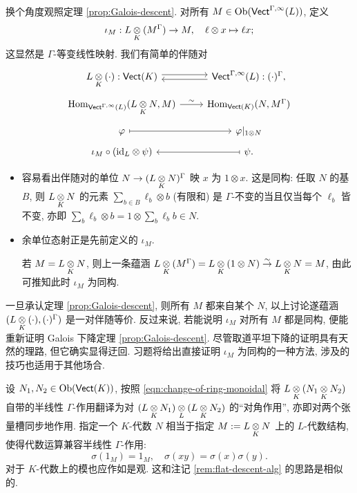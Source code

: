 换个角度观照定理 \ref{prop:Galois-descent}. 对所有 $M \in \operatorname{Ob}(\mathsf{Vect}^{\Gamma, \infty}(L))$, 定义
\begin{equation}\label{eqn:Galois-descent-iotaM}
	\iota_M: L \underset{K}{\otimes} (M^{\Gamma}) \to M, \quad
	\ell \otimes x \mapsto \ell x ;
\end{equation}
这显然是 $\Gamma$-等变线性映射. 我们有简单的伴随对
\begin{equation}\label{eqn:Galois-descent-adjunction}
	\begin{tikzcd}[row sep=tiny]
		L \dotimes{K} (\cdot) : \cate{Vect}(K) \arrow[shift left, r] & \cate{Vect}^{\Gamma, \infty}(L) : (\cdot)^{\Gamma}, \arrow[shift left, l] \\
		\Hom_{\cate{Vect}^{\Gamma, \infty}(L)} (L \dotimes{K} N, M) \arrow[r, "\sim"] & \Hom_{\cate{Vect}(K)}(N, M^{\Gamma}) \\
		\varphi \arrow[mapsto, r] & \varphi|_{1 \otimes N} \\
		\iota_M \circ (\identity_L \otimes \psi) & \psi. \arrow[mapsto, l]
	\end{tikzcd}
\end{equation}
\begin{itemize}
	\item 容易看出伴随对的单位 $N \to (L \underset{K}{\otimes} N)^{\Gamma}$ 映 $x$ 为 $1 \otimes x$. 这是同构: 任取 $N$ 的基 $B$, 则 $L \underset{K}{\otimes} N$ 的元素 $\sum_{b \in B} \ell_b \otimes b$ (有限和) 是 $\Gamma$-不变的当且仅当每个 $\ell_b$ 皆不变, 亦即 $\sum_b \ell_b \otimes b = 1 \otimes \sum_b \ell_b b \in N$.
	\item 余单位态射正是先前定义的 $\iota_M$.
	
	若 $M = L \underset{K}{\otimes} N$, 则上一条蕴涵 $L \underset{K}{\otimes} (M^{\Gamma}) = L \underset{K}{\otimes} (1 \otimes N) \stackrel{\sim}{\rightarrow} L \underset{K}{\otimes} N = M$, 由此可推知此时 $\iota_M$ 为同构. 
\end{itemize}

一旦承认定理 \ref{prop:Galois-descent}, 则所有 $M$ 都来自某个 $N$, 以上讨论遂蕴涵 $(L \underset{K}{\otimes} (\cdot), (\cdot)^{\Gamma})$ 是一对伴随等价. 反过来说, 若能说明 $\iota_M$ 对所有 $M$ 都是同构, 便能重新证明 Galois 下降定理 \ref{prop:Galois-descent}. 尽管取道平坦下降的证明具有天然的理路, 但它确实显得迂回. 习题将给出直接证明 $\iota_M$ 为同构的一种方法, 涉及的技巧也适用于其他场合.

\begin{remark}\label{rem:Galois-descent-alg}
	设 $N_1, N_2 \in \operatorname{Ob}(\mathsf{Vect}(K))$, 按照 \eqref{eqn:change-of-ring-monoidal} 将 $L \underset{K}{\otimes} (N_1 \underset{K}{\otimes} N_2)$ 自带的半线性 $\Gamma$-作用翻译为对 $(L \underset{K}{\otimes} N_1) \underset{L}{\otimes} (L \underset{K}{\otimes} N_2)$ 的``对角作用'', 亦即对两个张量槽同步地作用. 指定一个 $K$-代数 $N$ 相当于指定 $M := L \underset{K}{\otimes} N$ 上的 $L$-代数结构, 使得代数运算兼容半线性 $\Gamma$-作用:
	\[ \sigma(1_M) = 1_M , \quad \sigma (xy) = \sigma(x) \sigma(y). \]
	对于 $K$-代数上的模也应作如是观. 这和注记 \ref{rem:flat-descent-alg} 的思路是相似的.
\end{remark}

